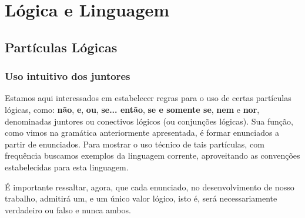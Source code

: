 \chapter{Lógica e Linguagem}

\section{Partículas Lógicas}

\subsection{Uso intuitivo dos juntores}

Estamos aqui interessados em estabelecer regras para o uso de certas partículas lógicas, como: \textbf{não}, \textbf{e},  \textbf{ou}, \textbf{se... então}, \textbf{se e somente se}, \textbf{nem} e \textbf{nor}, denominadas juntores ou conectivos lógicos (ou conjunções lógicas).
Sua função, como vimos na gramática anteriormente apresentada, é formar enunciados a partir de enunciados.
Para mostrar o uso técnico de tais partículas, com frequência buscamos exemplos da linguagem corrente, aproveitando as convenções estabelecidas para esta linguagem.

É importante ressaltar, agora, que cada enunciado, no desenvolvimento de nosso trabalho, admitirá um, e um único valor lógico, isto é, será necessariamente verdadeiro ou falso e nunca ambos.

